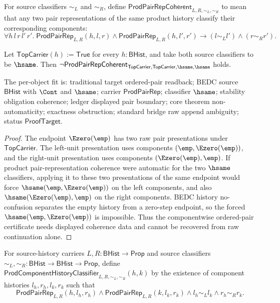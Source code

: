 \begin{definition}
\label{def:prod-pair-rep-coherent}
For source classifiers $\sim_L$ and $\sim_R$, define
$\mathsf{ProdPairRepCoherent}_{L,R,\sim_L,\sim_R}$ to mean that any two pair
representations of the same product history classify their corresponding
components:
$$
  \forall h\,l\,r\,l'\,r'.\;
  \mathsf{ProdPairRep}_{L,R}(h,l,r)\wedge
  \mathsf{ProdPairRep}_{L,R}(h,l',r')
  \to (l\sim_L l')\wedge(r\sim_R r').
$$
\end{definition}

\begin{theorem}
\label{thm:prod-pair-rep-coherence-not-automatic}
Let $\mathsf{TopCarrier}(h):=\mathsf{True}$ for every $h:\mathsf{BHist}$, and take both source classifiers to be $\hsame$. Then $\neg\mathsf{ProdPairRepCoherent}_{\mathsf{TopCarrier},\mathsf{TopCarrier},\hsame,\hsame}$ holds.

The per-object fit is: traditional target ordered-pair readback; BEDC source $\mathsf{BHist}$ with $\Cont$ and $\hsame$; carrier $\mathsf{ProdPairRep}$; classifier $\hsame$; stability obligation coherence; ledger displayed pair boundary; core theorem non-automaticity; exactness obstruction; standard bridge raw append ambiguity; status $\mathsf{ProofTarget}$.
\end{theorem}
\begin{proof}
The endpoint $\Ezero(\emp)$ has two raw pair presentations under $\mathsf{TopCarrier}$. The left-unit presentation uses components $(\emp,\Ezero(\emp))$, and the right-unit presentation uses components $(\Ezero(\emp),\emp)$. If product pair-representation coherence were automatic for the two $\hsame$ classifiers, applying it to these two presentations of the same endpoint would force $\hsame(\emp,\Ezero(\emp))$ on the left components, and also $\hsame(\Ezero(\emp),\emp)$ on the right components. BEDC history no-confusion separates the empty history from a zero-step endpoint, so the forced $\hsame(\emp,\Ezero(\emp))$ is impossible. Thus the componentwise ordered-pair certificate needs displayed coherence data and cannot be recovered from raw continuation alone.
\end{proof}

\begin{definition}
\label{def:prod-component-history-classifier}
For source-history carriers $L,R:\mathsf{BHist}\to\mathsf{Prop}$ and source
classifiers $\sim_L,\sim_R:\mathsf{BHist}\to\mathsf{BHist}\to\mathsf{Prop}$,
define $\mathsf{ProdComponentHistoryClassifier}_{L,R,\sim_L,\sim_R}(h,k)$ by
the existence of component histories $l_h,r_h,l_k,r_k$ such that
$$
\mathsf{ProdPairRep}_{L,R}(h,l_h,r_h)
\wedge
\mathsf{ProdPairRep}_{L,R}(k,l_k,r_k)
\wedge
l_h\sim_L l_k
\wedge
r_h\sim_R r_k.
$$
\end{definition}

